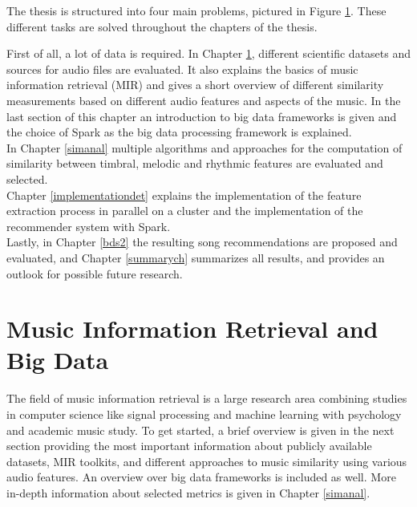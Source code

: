 \noindent The thesis is structured into four main problems, pictured in Figure \ref{structh}. These different tasks are solved throughout the chapters of the thesis.

\begin{figure}[htbp]
	\centering
	\label{structh}
\end{figure}

\noindent First of all, a lot of data is required. In Chapter \ref{audiofeat}, different scientific datasets and sources for audio files are evaluated. It also explains the basics of music information retrieval (MIR) and gives a short overview of different similarity measurements based on different audio features and aspects of the music. In the last section of this chapter an introduction to big data frameworks is given and the choice of Spark as the big data processing framework is explained.\\
In Chapter \ref{simanal} multiple algorithms and approaches for the computation of similarity between timbral, melodic and rhythmic features are evaluated and selected.\\
Chapter \ref{implementationdet} explains the implementation of the feature extraction process in parallel on a cluster and the implementation of the recommender system with Spark.\\
Lastly, in Chapter \ref{bds2} the resulting song recommendations are proposed and evaluated, and Chapter \ref{summarych} summarizes all results, and provides an outlook for possible future research. 


\chapter{Music Information Retrieval and Big Data}\label{audiofeat}

The field of music information retrieval is a large research area combining studies in computer science like signal processing and machine learning with psychology and academic music study. To get started, a brief overview is given in the next section providing the most important information about publicly available datasets, MIR toolkits, and different approaches to music similarity using various audio features. An overview over big data frameworks is included as well. More in-depth information about selected metrics is given in Chapter \ref{simanal}. 

